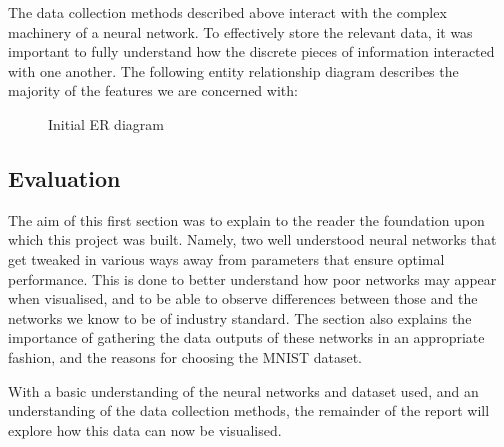 \documentclass[a4paper,11pt,titlepage]{article}
\begin{document}
	The data collection methods described above interact with the complex machinery of a neural network. To effectively store the relevant data, it was important to fully understand how the discrete pieces of information interacted with one another. The following entity relationship diagram describes the majority of the features we are concerned with:

	\begin{figure}[H]
    			\caption{Initial ER diagram}%
	\end{figure}	
	
\subsection{Evaluation}
The aim of this first section was to explain to the reader the foundation upon which this project was built. Namely, two well understood neural networks that get tweaked in various ways away from parameters that ensure optimal performance. This is done to better understand how poor networks may appear when visualised, and to be able to observe differences between those and the networks we know to be of industry standard. The section also explains the importance of gathering the data outputs of these networks in an appropriate fashion, and the reasons for choosing the MNIST dataset. 
	\par 
	With a basic understanding of the neural networks and dataset used, and an understanding of the data collection methods, the remainder of the report will explore how this data can now be visualised.

\clearpage
	
\end{document}
